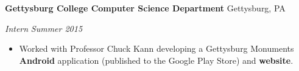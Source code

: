 \documentclass[11pt]{article}
\begin{document}
\textbf{Gettysburg College Computer Science Department}
\hfill
Gettysburg, PA

\textit{Intern}
\hfill
\textit{Summer 2015}

\begin{itemize}
	\item Worked with Professor Chuck Kann developing a Gettysburg Monuments \textbf{Android} application (published to the Google Play Store) and \textbf{website}. 
\end{itemize}










\end{document}
